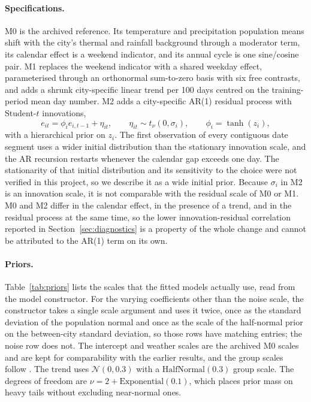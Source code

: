 \documentclass{article}
\begin{document}
\paragraph{Specifications.}
M0 is the archived reference. Its temperature and precipitation population means shift with the
city's thermal and rainfall background through a moderator term, its calendar effect is a weekend
indicator, and its annual cycle is one sine/cosine pair. M1 replaces the weekend indicator with a
shared weekday effect, parameterised through an orthonormal sum-to-zero basis with six free
contrasts, and adds a shrunk city-specific linear trend per 100 days centred on the training-period
mean day number. M2 adds a city-specific AR(1) residual process with Student-$t$ innovations,
\begin{equation}
e_{it}=\phi_i e_{i,t-1}+\eta_{it},\qquad
\eta_{it}\sim t_\nu(0,\sigma_i),\qquad \phi_i=\tanh(z_i),
\end{equation}
with a hierarchical prior on $z_i$. The first observation of every contiguous date segment uses a
wider initial distribution than the stationary innovation scale, and the AR recursion restarts
whenever the calendar gap exceeds one day. The stationarity of that initial distribution and its
sensitivity to the choice were not verified in this project, so we describe it as a wide initial
prior. Because $\sigma_i$ in M2 is an innovation scale, it is not comparable with the residual scale
of M0 or M1. M0 and M2 differ in the calendar effect, in the presence of a trend, and in the residual
process at the same time, so the lower innovation-residual correlation reported in
Section~\ref{sec:diagnostics} is a property of the whole change and cannot be attributed to the AR(1)
term on its own.

\paragraph{Priors.}
Table~\ref{tab:priors} lists the scales that the fitted models actually use, read from the model
constructor. For the varying coefficients other than the noise scale, the constructor takes a single
scale argument and uses it twice, once as the standard deviation of the population normal and once
as the scale of the half-normal prior on the between-city standard deviation, so those rows have
matching entries; the noise row does not. The intercept and weather scales are the archived M0 scales
and are kept for comparability with the earlier results, and the group scales follow
\citet{gelman2006prior}. The trend uses $\mathcal{N}(0,0.3)$ with a $\text{HalfNormal}(0.3)$ group
scale. The degrees of freedom are $\nu=2+\text{Exponential}(0.1)$, which places prior mass on heavy
tails without excluding near-normal ones.
\end{document}
